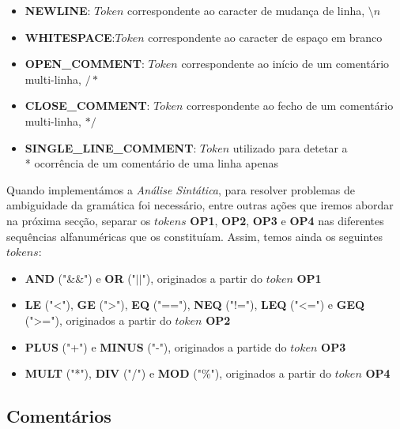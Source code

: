 \documentclass[11pt,a4paper]{article}
\begin{document}
	\begin{itemize}
	\item \textbf{NEWLINE}: $Token$ correspondente ao caracter de mudança de linha, $\setminus n$
	
	\item \textbf{WHITESPACE}:$Token$ correspondente ao caracter de espaço em branco
	
	\item \textbf{OPEN\_COMMENT}:  $Token$ correspondente ao início de um comentário multi-linha, $/*$
	
	\item \textbf{CLOSE\_COMMENT}: $Token$ correspondente ao fecho de um comentário multi-linha, $*/$
	
	\item \textbf{SINGLE\_LINE\_COMMENT}: $Token$ utilizado para detetar a \\* ocorrência de um comentário de uma linha apenas
	\end{itemize}
	
	Quando implementámos a \emph{Análise Sintática}, para resolver problemas de ambiguidade da gramática foi necessário, entre outras ações que iremos abordar na próxima secção, separar os $tokens$ \textbf{OP1}, \textbf{OP2}, \textbf{OP3} e \textbf{OP4} nas diferentes sequências alfanuméricas que os constituíam. Assim, temos ainda os seguintes $tokens$:
	
	\begin{itemize}
	\item \textbf{AND} ("\&\&") e \textbf{OR} ("$||$"), originados a partir do $token$ \textbf{OP1}
	
	\item \textbf{LE} ("<"), \textbf{GE} (">"), \textbf{EQ} ("=="), \textbf{NEQ} ("!="), \textbf{LEQ} ("<=") e \textbf{GEQ} (">="), originados a partir do $token$ \textbf{OP2}
	
	\item \textbf{PLUS} ("+") e \textbf {MINUS} ("-"), originados a partide do $token$ \textbf{OP3}
	
	\item \textbf{MULT} ("*"), \textbf{DIV} ("/") e \textbf{MOD} ("\%"), originados a partir do $token$ \textbf{OP4}
	\end{itemize}
	
	\subsection{Comentários}
	
\end{document}
